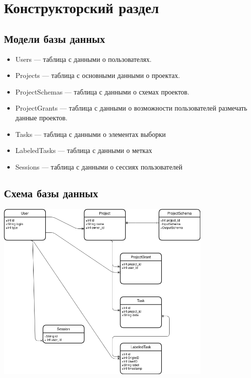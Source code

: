 \section{Конструкторский раздел}

\subsection{Модели базы данных}

\begin{frame}

\begin{itemize}
    \item Users --- таблица с данными о пользователях.
    \item Projects --- таблица с основными данными о проектах.
    \item ProjectSchemas --- таблица с данными о схемах проектов.
    \item ProjectGrants --- таблица с данными о возможности пользователей размечать данные проектов.
    \item Tasks --- таблица с данными о элементах выборки
    \item LabeledTasks --- таблица с данными о метках
    \item Sessions --- таблица с данными о сессиях пользователей
\end{itemize}


\end{frame}

\subsection{Схема базы данных}

\begin{frame}
    \includegraphics[width=0.8\textwidth]{./dbschema.png}
\end{frame}


